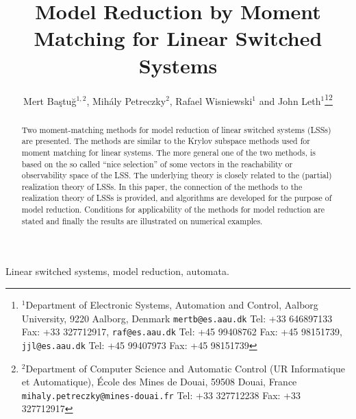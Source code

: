 \documentclass[journal]{IEEEtran}
\begin{document}
\title{Model Reduction by Moment Matching for Linear Switched Systems}


\author{Mert Ba\c{s}tu\u{g}$^{1,2}$, Mih\'{a}ly Petreczky$^{2}$, Rafael Wisniewski$^{1}$ and John Leth$^{1}$\thanks{$^{1}$Department of Electronic Systems, Automation and Control, Aalborg University, 9220 Aalborg, Denmark {\tt\small mertb@es.aau.dk} Tel: +33 646897133 Fax: +33 327712917, {\tt\small raf@es.aau.dk} Tel: +45 99408762 Fax: +45 98151739, {\tt\small jjl@es.aau.dk} Tel: +45 99407973 Fax: +45 98151739}\thanks{$^{2}$Department of Computer Science and Automatic Control (UR Informatique et Automatique), \'{E}cole des Mines de Douai, 59508 Douai, France {\tt\small mihaly.petreczky@mines-douai.fr} Tel: +33 327712238 Fax: +33 327712917}}























\maketitle

\begin{abstract}
Two moment-matching methods for model reduction of linear switched systems (LSSs) are presented. The methods are similar to the Krylov subspace methods used for moment matching for linear systems. The more general one of the two methods, is based on the so called ``nice selection'' of some vectors in the reachability or observability space of the LSS. The underlying theory is closely related to the (partial) realization theory of LSSs. In this paper, the connection of the methods to the realization theory of LSSs is provided, and algorithms are developed for the purpose of model reduction. Conditions for applicability of the methods for model reduction are stated and finally the results are illustrated on numerical examples.
\end{abstract}

\begin{IEEEkeywords}
Linear switched systems, model reduction, automata.
\end{IEEEkeywords}
\end{document}
